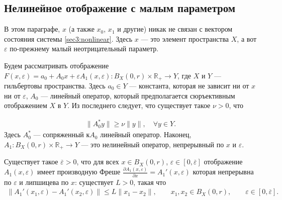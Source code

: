 \documentclass[../main.tex]{subfiles}
\begin{document}
\subsection{Нелинейное отображение с малым параметром}

В этом параграфе, $x$ (а также $x_0$, $x_1$ и другие) никак не связан с вектором состояния системы \eqref{sec3:nonlinear}.
Здесь $x$ --- это элемент пространства $X$, а вот $\varepsilon$ по-прежнему малый неотрицательный параметр.

Будем рассматривать отображение $F(x, \varepsilon) = a_0 + A_0x + \varepsilon A_1(x,\varepsilon): B_X(0, r) \times \mathbb{R}_+ \rightarrow Y$, где $X$ и $Y$ --- гильбертовы пространства.
Здесь $a_0 \in Y$ --- константа, которая не зависит ни от $x$ ни от $\varepsilon$, $A_0$ --- линейный оператор, который предполагается сюръективным отображением $X$ в $Y$. 
Из последнего следует, что существует такое $\nu > 0$, что

\begin{gather}\label{regular}
    \| A_0^*y\| \geqslant \nu \|y\|, \quad \forall y \in Y.
\end{gather}
Здесь $A_0^* $ --- сопряженный к$A_0$ линейный оператор.
Наконец,  $A_1: B_X(0, r) \times \mathbb{R}_+ \to Y $ --- это нелинейный оператор, непрерывный по $x$ и $\varepsilon$.
\begin{assumption}\label{as:derivative_of_A1}
    Существует такое $\overline{\varepsilon} > 0$, что для всех $x \in B_X(0,r)$, $\varepsilon \in [0, \overline{\varepsilon}]$ отображение $A_1(x, \varepsilon)$  имеет производную Фреше $\frac{\partial A_1(x, \varepsilon)}{\partial x} = A_1'(x, \varepsilon)$  которая непрерывна по $\varepsilon$ и липшицева по $x$: существует $L>0$, такая что
    \begin{gather*}
        \|A_1'(x_1,\varepsilon) - A_1'(x_2,\varepsilon) \| \leqslant L\|x_1-x_2\|, \qquad x_1, x_2 \in B_X(0,r), \qquad \varepsilon \in [0, \overline{\varepsilon}].
    \end{gather*}
\end{assumption}
\end{document}
